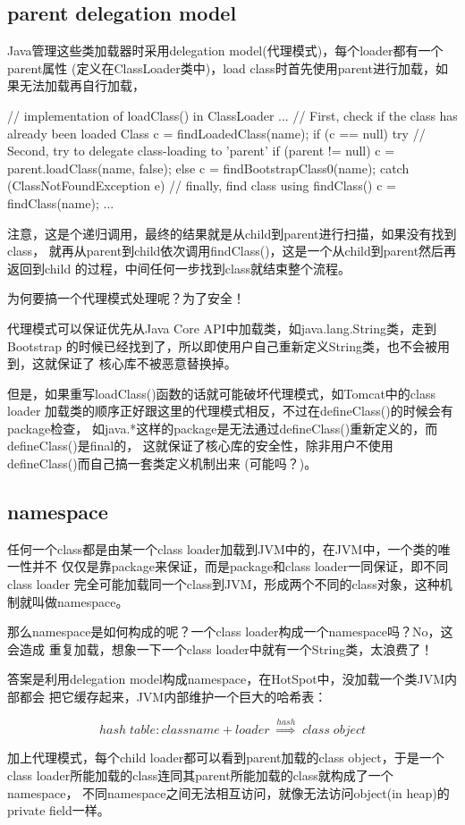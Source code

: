 \subsection[parent delegation model]{parent delegation model}
\label{sec:delegationmodel}
Java管理这些类加载器时采用delegation model(代理模式)，每个loader都有一个parent属性
(定义在ClassLoader类中)，load class时首先使用parent进行加载，如果无法加载再自行加载，

\begin{javacode}
// implementation of loadClass() in ClassLoader
...
// First, check if the class has already been loaded
Class c = findLoadedClass(name);
if (c == null) {
  try {
    // Second, try to delegate class-loading to 'parent'
    if (parent != null) {
      c = parent.loadClass(name, false);
    } else {
      c = findBootstrapClass0(name);
    }
  } catch (ClassNotFoundException e) {
    // finally, find class using findClass()
    c = findClass(name);
  }
}
...
\end{javacode}

注意，这是个递归调用，最终的结果就是从child到parent进行扫描，如果没有找到class，
就再从parent到child依次调用findClass()，这是一个从child到parent然后再返回到child
的过程，中间任何一步找到class就结束整个流程。

为何要搞一个代理模式处理呢？为了安全！

代理模式可以保证优先从Java Core API中加载类，如java.lang.String类，走到Bootstrap
的时候已经找到了，所以即使用户自己重新定义String类，也不会被用到，这就保证了
核心库不被恶意替换掉。

但是，如果重写loadClass()函数的话就可能破坏代理模式，如Tomcat中的class loader
加载类的顺序正好跟这里的代理模式相反，不过在defineClass()的时候会有package检查，
如java.*这样的package是无法通过defineClass()重新定义的，而defineClass()是final的，
这就保证了核心库的安全性，除非用户不使用defineClass()而自己搞一套类定义机制出来
(可能吗？)。

\subsection[namespace]{namespace}
任何一个class都是由某一个class loader加载到JVM中的，在JVM中，一个类的唯一性并不
仅仅是靠package来保证，而是package和class loader一同保证，即不同class loader
完全可能加载同一个class到JVM，形成两个不同的class对象，这种机制就叫做namespace。

那么namespace是如何构成的呢？一个class loader构成一个namespace吗？No，这会造成
重复加载，想象一下一个class loader中就有一个String类，太浪费了！

答案是利用delegation model构成namespace，在HotSpot中，没加载一个类JVM内部都会
把它缓存起来，JVM内部维护一个巨大的哈希表：

$$hash\;table: classname+loader\;\overset{hash}\Longrightarrow\;class\;object$$

加上代理模式，每个child loader都可以看到parent加载的class object，于是一个
class loader所能加载的class连同其parent所能加载的class就构成了一个namespace，
不同namespace之间无法相互访问，就像无法访问object(in heap)的private field一样。